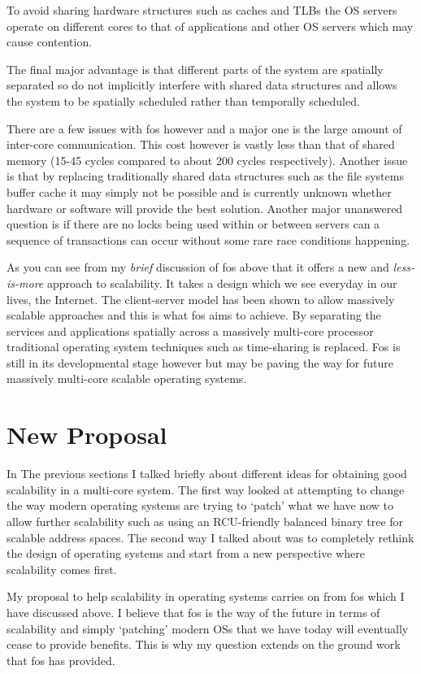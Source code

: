 \documentclass[journal]{IEEEtran}
\begin{document}
To avoid sharing hardware structures such as caches and TLBs the OS servers operate on different cores to that of applications and other OS servers which may cause contention. 

The final major advantage is that different parts of the system are spatially separated so do not implicitly interfere with shared data structures and allows the system to be spatially scheduled rather than temporally scheduled.  

There are a few issues with fos however and a major one is the large amount of inter-core communication. This cost however is vastly less than that of shared memory (15-45 cycles compared to about 200 cycles respectively). Another issue is that by replacing traditionally shared data structures such as the file systems buffer cache it may simply not be possible and is currently unknown whether hardware or software will provide the best solution. Another major unanswered question is if there are no locks being used within or between servers can a sequence of transactions can occur without some rare race conditions happening.

As you can see from my \emph{brief} discussion of fos above that it offers a new and \emph{less-is-more} approach to scalability. It takes a design which we see everyday in our lives, the Internet. The client-server model has been shown to allow massively scalable approaches and this is what fos aims to achieve. By separating the services and applications spatially across a massively multi-core processor traditional operating system techniques such as time-sharing is replaced. Fos is still in its developmental stage however but may be paving the way for future massively multi-core scalable operating systems.

\section{New Proposal}

In The previous sections I talked briefly about different ideas for obtaining good scalability in a multi-core system. The first way looked at attempting to change the way modern operating systems are trying to `patch' what we have now to allow further scalability such as using an RCU-friendly balanced binary tree for scalable address spaces. The second way I talked about was to completely rethink the design of operating systems and start from a new perspective where scalability comes first.

My proposal to help scalability in operating systems carries on from fos which I have discussed above. I believe that fos is the way of the future in terms of scalability and simply `patching' modern OSs that we have today will eventually cease to provide benefits. This is why my question extends on the ground work that fos has provided.
\end{document}
